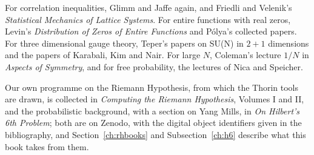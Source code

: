 For correlation inequalities, Glimm and Jaffe again, and Friedli and Velenik's \emph{Statistical Mechanics of Lattice Systems}. For entire functions with real zeros, Levin's \emph{Distribution of Zeros of Entire Functions} and P\'olya's collected papers. For three dimensional gauge theory, Teper's papers on SU(N) in $2+1$ dimensions and the papers of Karabali, Kim and Nair. For large $N$, Coleman's lecture \emph{$1/N$} in \emph{Aspects of Symmetry}, and for free probability, the lectures of Nica and Speicher.

Our own programme on the Riemann Hypothesis, from which the Thorin tools are drawn, is collected in \emph{Computing the Riemann Hypothesis}, Volumes I and II, and the probabilistic background, with a section on Yang Mills, in \emph{On Hilbert's 6th Problem}; both are on Zenodo, with the digital object identifiers given in the bibliography, and Section~\ref{ch:rhbooks} and Subsection~\ref{ch:h6} describe what this book takes from them.
